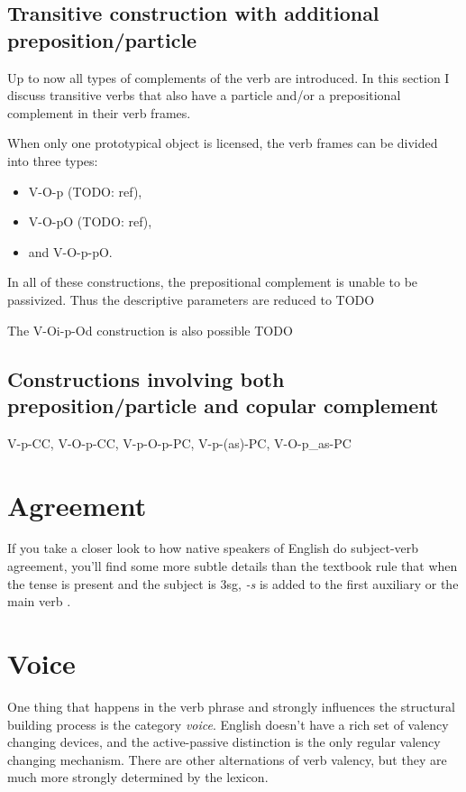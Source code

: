 \documentclass[UTF8, a4paper, oneside, scheme=plain, 12pt]{ctexbook}
\newcommand*{\citesec}[1]{\S~{#1}}
\newcommand*{\citechap}[1]{Ch~{#1}}
\newcommand{\form}[1]{\emph{#1}}
\begin{document}
\subsection{Transitive construction with additional preposition/particle}

Up to now all types of complements of the verb are introduced.
In this section I discuss 
transitive verbs that also have a particle and/or a prepositional complement 
in their verb frames.

When only one prototypical object is licensed,
the verb frames can be divided into three types:
\begin{itemize}
    \item V-O-p (TODO: ref),
    \item V-O-pO (TODO: ref), 
    \item and V-O-p-pO.
\end{itemize}
In all of these constructions, 
the prepositional complement is unable to be passivized.
Thus the descriptive parameters are reduced to TODO 

The V-Oi-p-Od construction is also possible TODO 

\subsection{Constructions involving both preposition/particle and copular complement}

V-p-CC, V-O-p-CC, V-p-O-p-PC, V-p-(as)-PC, V-O-p_as-PC

\section{Agreement}

If you take a closer look to how native speakers of English do subject-verb agreement,
you'll find some more subtle details than 
the textbook rule that when the tense is \acl{present}
and the subject is 3sg, 
\form{-s} is added to the first auxiliary or the main verb
\citep[\citechap{5}, \citesec{18}]{cgel}.

\section{Voice} 

One thing that happens in the verb phrase 
and strongly influences the structural building process is the category \emph{voice}.
English doesn't have a rich set of valency changing devices,
and the active-passive distinction is the only regular valency changing mechanism.
There are other alternations of verb valency,
but they are much more strongly determined by the lexicon. 
\end{document}
